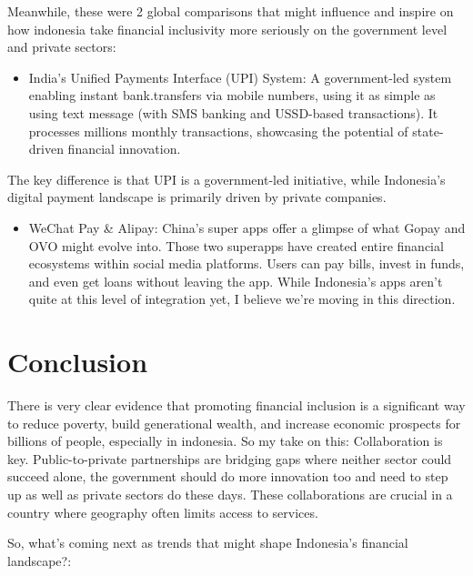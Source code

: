 \documentclass[10pt]{article}
\begin{document}
Meanwhile, these were 2 global comparisons that might influence and inspire on how indonesia take financial inclusivity more seriously on the government level and private sectors:

\begin{itemize}
  \item India's Unified Payments Interface (UPI) System: A government-led system enabling instant bank.transfers via mobile numbers, using it as simple as using text message (with SMS banking and USSD-based transactions). It processes millions monthly transactions, showcasing the potential of state-driven financial innovation.
\end{itemize}

The key difference is that UPI is a government-led initiative, while Indonesia's digital payment landscape is primarily driven by private companies.

\begin{itemize}
  \item WeChat Pay \& Alipay: China's super apps offer a glimpse of what Gopay and OVO might evolve into. Those two superapps have created entire financial ecosystems within social media platforms. Users can pay bills, invest in funds, and even get loans without leaving the app. While Indonesia's apps aren't quite at this level of integration yet, I believe we're moving in this direction.
\end{itemize}

\section*{Conclusion}
There is very clear evidence that promoting financial inclusion is a significant way to reduce poverty, build generational wealth, and increase economic prospects for billions of people, especially in indonesia. So my take on this: Collaboration is key. Public-to-private partnerships are bridging gaps where neither sector could succeed alone, the government should do more innovation too and need to step up as well as private sectors do these days. These collaborations are crucial in a country where geography often limits access to services.

So, what's coming next as trends that might shape Indonesia's financial landscape?:
\end{document}
